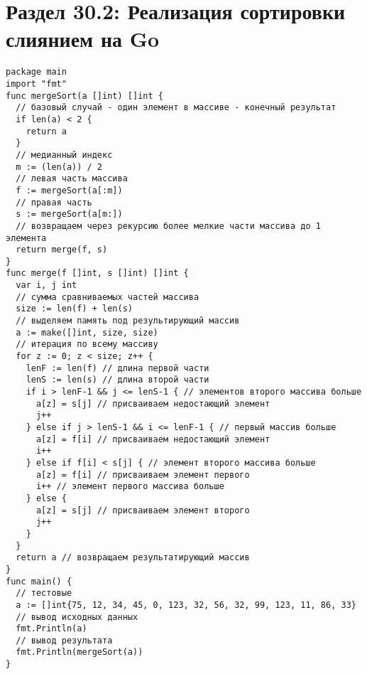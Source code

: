 \section*{Раздел 30.2: Реализация сортировки слиянием на Go}
\begin{tcolorbox}
\begin{verbatim}
package main
import "fmt"
func mergeSort(a []int) []int {
  // базовый случай - один элемент в массиве - конечный результат
  if len(a) < 2 {
    return a
  }
  // медианный индекс
  m := (len(a)) / 2
  // левая часть массива
  f := mergeSort(a[:m])
  // правая часть
  s := mergeSort(a[m:])
  // возвращаем через рекурсию более мелкие части массива до 1 элемента
  return merge(f, s)
}
func merge(f []int, s []int) []int {
  var i, j int
  // сумма сравниваемых частей массива
  size := len(f) + len(s)
  // выделяем память под результирующий массив
  a := make([]int, size, size)
  // итерация по всему массиву
  for z := 0; z < size; z++ {
    lenF := len(f) // длина первой части
    lenS := len(s) // длина второй части
    if i > lenF-1 && j <= lenS-1 { // элементов второго массива больше
      a[z] = s[j] // присваиваем недостающий элемент
      j++ 
    } else if j > lenS-1 && i <= lenF-1 { // первый массив больше
      a[z] = f[i] // присваиваем недостающий элемент
      i++ 
    } else if f[i] < s[j] { // элемент второго массива больше
      a[z] = f[i] // присваиваем элемент первого
      i++ // элемент первого массива больше
    } else { 
      a[z] = s[j] // присваиваем элемент второго
      j++
    }
  }
  return a // возвращаем результатирующий массив
}
func main() {
  // тестовые 
  a := []int{75, 12, 34, 45, 0, 123, 32, 56, 32, 99, 123, 11, 86, 33}
  // вывод исходных данных
  fmt.Println(a)
  // вывод результата
  fmt.Println(mergeSort(a))
}
\end{verbatim}
\end{tcolorbox}
